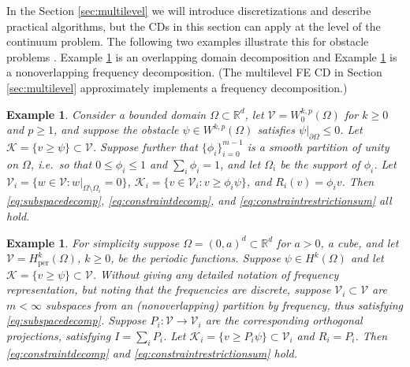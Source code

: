 \documentclass[letterpaper,final,12pt,reqno]{amsart}
\theoremstyle{cstyle}
\theoremstyle{dstyle}
\newtheorem{example}[theorem]{Example}
\numberwithin{equation}{section}
\numberwithin{figure}{section}
\numberwithin{table}{section}
\numberwithin{theorem}{section}
\newcommand{\RR}{\mathbb{R}}
\newcommand{\cK}{\mathcal{K}}
\newcommand{\cV}{\mathcal{V}}
\begin{document}
In the Section \ref{sec:multilevel} we will introduce discretizations and describe practical algorithms, but the CDs in this section can apply at the level of the continuum problem.  The following two examples illustrate this for obstacle problems \cite{GraeserKornhuber2009}.   Example \ref{ex:domaindecomposition} is an overlapping domain decomposition and Example \ref{ex:frequencydecomposition} is a nonoverlapping frequency decomposition.  (The multilevel FE CD in Section \ref{sec:multilevel} approximately implements a frequency decomposition.)

\begin{example}  \label{ex:domaindecomposition}  Consider a bounded domain $\Omega \subset \RR^d$, let $\cV = W_0^{k,p}(\Omega)$ for $k\ge 0$ and $p\ge 1$, and suppose the obstacle $\psi \in W^{k,p}(\Omega)$ satisfies $\psi|_{\partial \Omega} \le 0$.  Let $\cK = \{v \ge \psi\} \subset \cV$.  Suppose further that $\{\phi_i\}_{i=0}^{m-1}$ is a smooth partition of unity on $\Omega$, i.e.~so that $0 \le \phi_i\le 1$ and $\sum_i \phi_i = 1$, and let $\Omega_i$ be the support of $\phi_i$.  Let $\cV_i = \{w \in \cV:w|_{\Omega \setminus \Omega_i} =0 \}$, $\cK_i = \{v \in \cV_i: v \ge \phi_i \psi\}$, and $R_i(v) = \phi_i v$.  Then \eqref{eq:subspacedecomp}, \eqref{eq:constraintdecomp}, and \eqref{eq:constraintrestrictionsum} all hold.
\end{example}


\begin{example}  \label{ex:frequencydecomposition}  For simplicity suppose $\Omega = (0,a)^d \subset \RR^d$ for $a>0$, a cube, and let $\cV = H_{\text{per}}^k(\Omega)$, $k\ge 0$, be the periodic functions.  Suppose $\psi \in H^k(\Omega)$ and let $\cK = \{v \ge \psi\} \subset \cV$.  Without giving any detailed notation of frequency representation, but noting that the frequencies are discrete, suppose $\cV_i \subset \cV$ are $m<\infty$ subspaces from an (nonoverlapping) partition by frequency, thus satisfying \eqref{eq:subspacedecomp}.  Suppose $P_i:\cV \to \cV_i$ are the corresponding orthogonal projections, satisfying $I = \sum_i P_i$.  Let $\cK_i = \{v \ge P_i \psi\} \subset \cV_i$ and $R_i = P_i$.  Then \eqref{eq:constraintdecomp} and \eqref{eq:constraintrestrictionsum} hold.
\end{example}
\end{document}
